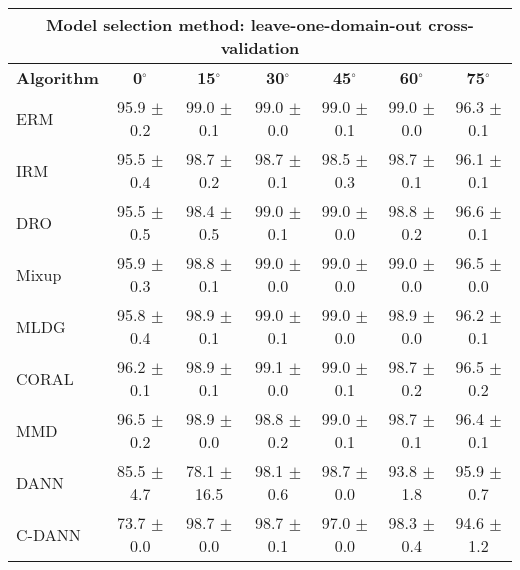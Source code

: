 \documentclass{article}
\begin{document}
\begin{center}
\begin{tabular}{lcccccc}
\toprule
\multicolumn{7}{c}{\textbf{Model selection method: leave-one-domain-out cross-validation}} \\
\midrule
\textbf{Algorithm}    & \textbf{0$^{\circ}$}      & \textbf{15$^{\circ}$}     & \textbf{30$^{\circ}$}     & \textbf{45$^{\circ}$}     & \textbf{60$^{\circ}$}     & \textbf{75$^{\circ}$}     \\
\midrule
ERM                       & 95.9 $\pm$ 0.2            & 99.0 $\pm$ 0.1            & 99.0 $\pm$ 0.0            & 99.0 $\pm$ 0.1            & 99.0 $\pm$ 0.0            & 96.3 $\pm$ 0.1            \\
IRM                       & 95.5 $\pm$ 0.4            & 98.7 $\pm$ 0.2            & 98.7 $\pm$ 0.1            & 98.5 $\pm$ 0.3            & 98.7 $\pm$ 0.1            & 96.1 $\pm$ 0.1            \\
DRO                 & 95.5 $\pm$ 0.5            & 98.4 $\pm$ 0.5            & 99.0 $\pm$ 0.1            & 99.0 $\pm$ 0.0            & 98.8 $\pm$ 0.2            & 96.6 $\pm$ 0.1            \\
Mixup                     & 95.9 $\pm$ 0.3            & 98.8 $\pm$ 0.1            & 99.0 $\pm$ 0.0            & 99.0 $\pm$ 0.0            & 99.0 $\pm$ 0.0            & 96.5 $\pm$ 0.0            \\
MLDG                      & 95.8 $\pm$ 0.4            & 98.9 $\pm$ 0.1            & 99.0 $\pm$ 0.1            & 99.0 $\pm$ 0.0            & 98.9 $\pm$ 0.0            & 96.2 $\pm$ 0.1            \\
CORAL                     & 96.2 $\pm$ 0.1            & 98.9 $\pm$ 0.1            & 99.1 $\pm$ 0.0            & 99.0 $\pm$ 0.1            & 98.7 $\pm$ 0.2            & 96.5 $\pm$ 0.2            \\
MMD                       & 96.5 $\pm$ 0.2            & 98.9 $\pm$ 0.0            & 98.8 $\pm$ 0.2            & 99.0 $\pm$ 0.1            & 98.7 $\pm$ 0.1            & 96.4 $\pm$ 0.1            \\
DANN                       & 85.5 $\pm$ 4.7            & 78.1 $\pm$ 16.5           & 98.1 $\pm$ 0.6            & 98.7 $\pm$ 0.0            & 93.8 $\pm$ 1.8            & 95.9 $\pm$ 0.7            \\
C-DANN                   & 73.7 $\pm$ 0.0            & 98.7 $\pm$ 0.0            & 98.7 $\pm$ 0.1            & 97.0 $\pm$ 0.0            & 98.3 $\pm$ 0.4            & 94.6 $\pm$ 1.2            \\
\bottomrule
\end{tabular}
\end{center}
\end{document}
